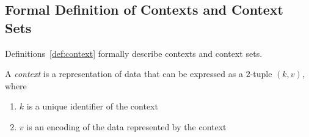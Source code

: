 \subsection{Formal Definition of Contexts and Context Sets}

Definitions~\ref{def:context} formally describe contexts and context sets.

\begin{definition}[context]
    \label{def:action}
    A \emph{context} is a representation of data that can be expressed as a $2$-tuple $(k,v)$, where
    \begin{enumerate}
        \item $k$ is a unique identifier of the context
        \item $v$ is an encoding of the data represented by the context
    \end{enumerate}
\end{definition}
